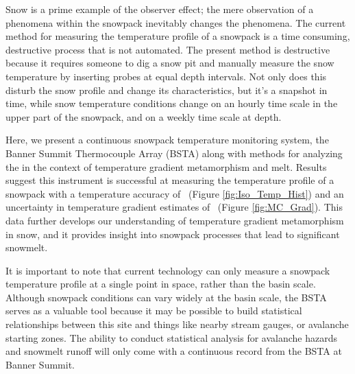 Snow is a prime example of the observer effect; the mere observation of a phenomena within the snowpack inevitably changes the phenomena. The current method for measuring the temperature profile of a snowpack is a time consuming, destructive process that is not automated. The present method is destructive because it requires someone to dig a snow pit and manually measure the snow temperature by inserting probes at equal depth intervals. Not only does this disturb the snow profile and change its characteristics, but it’s a snapshot in time, while snow temperature conditions change on an hourly time scale in the upper part of the snowpack, and on a weekly time scale at depth.

Here, we present a continuous snowpack temperature monitoring system, the Banner Summit Thermocouple Array (BSTA) along with methods for analyzing the in the context of temperature gradient metamorphism and melt. Results suggest this instrument is successful at measuring the temperature profile of a snowpack with a temperature accuracy of \isostd \ (Figure \ref{fig:Iso_Temp_Hist}) and an uncertainty in temperature gradient estimates of \gradstd \ (Figure \ref{fig:MC_Grad}). This data further develops our understanding of temperature gradient metamorphism in snow, and it provides insight into snowpack processes that lead to significant snowmelt.

It is important to note that current technology can only measure a snowpack temperature profile at a single point in space, rather than the basin scale. Although snowpack conditions can vary widely at the basin scale, the BSTA serves as a valuable tool because it may be possible to build statistical relationships between this site and things like nearby stream gauges, or avalanche starting zones. The ability to conduct statistical analysis for avalanche hazards and snowmelt runoff will only come with a continuous record from the BSTA at Banner Summit.  